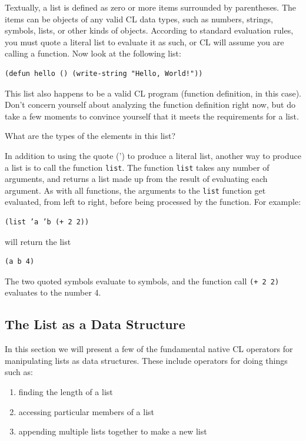 \documentclass [11pt]{book}
\begin{document}
Textually, a list is defined as zero or more items
surrounded by parentheses. The items can be objects of any valid CL
data types, such as numbers, strings, symbols, lists, or other kinds
of objects. According to standard evaluation rules, you must quote a
literal list to evaluate it as such, or CL will assume you are calling
a function. Now look at the following list:

\begin{verbatim}(defun hello () (write-string "Hello, World!"))
\end{verbatim}This list also happens to be a valid CL program (function definition,
in this case). Don't concern yourself about analyzing the function definition
right now, but do take a few moments to convince yourself that it
meets the requirements for a list.



What are the types of the elements in this list?



In addition to using the quote (') to produce a literal list, another
way to produce a list is to call the function \texttt{list}. The function \texttt{list} takes any number of arguments, and returns a list made up
from the result of evaluating each argument. As with all functions,
the arguments to the \texttt{list} function get evaluated, from left to right, before being
processed by the function. For example:

\begin{verbatim}(list ’a ’b (+ 2 2))
\end{verbatim}will return the list

\begin{verbatim}(a b 4)
\end{verbatim}The two quoted symbols evaluate to symbols, and the function
call \texttt{(+ 2 2)} evaluates to the number 4.



\subsection{The List as a Data Structure}

\label{subsec:thelistasadatastructure}

In this section we will present a few of the fundamental native CL operators for manipulating
lists as data structures. These include operators for doing things such as:

\begin{enumerate}

\item finding the length of a list

\item accessing particular members of a list

\item appending multiple lists together to make a new list

\end{enumerate}
\end{document}
